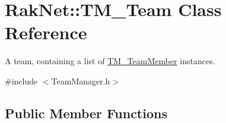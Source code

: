 \hypertarget{class_rak_net_1_1_t_m___team}{\section{Rak\-Net\-:\-:T\-M\-\_\-\-Team Class Reference}
\label{class_rak_net_1_1_t_m___team}
}


A team, containing a list of \hyperlink{class_rak_net_1_1_t_m___team_member}{T\-M\-\_\-\-Team\-Member} instances.  




{\ttfamily \#include $<$Team\-Manager.\-h$>$}

\subsection*{Public Member Functions}
